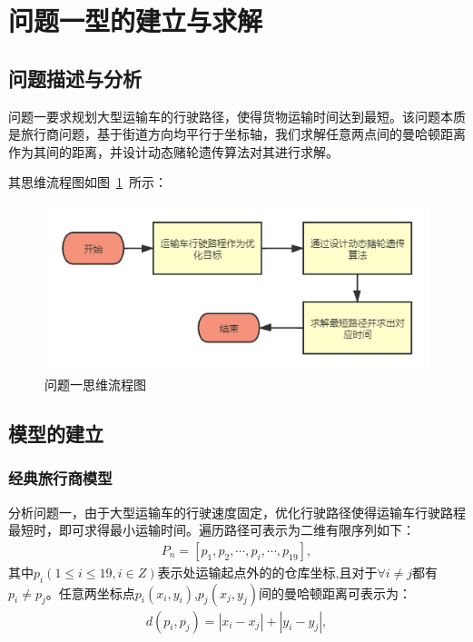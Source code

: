 \documentclass{whutmod}
\begin{document}
	\section{问题一型的建立与求解}
    \subsection{问题描述与分析}
问题一要求规划大型运输车的行驶路径，使得货物运输时间达到最短。该问题本质是旅行商问题，基于街道方向均平行于坐标轴，我们求解任意两点间的曼哈顿距离作为其间的距离，并设计动态赌轮遗传算法对其进行求解。


    其思维流程图如图~\ref{lct}~所示：

       \begin{figure}[H]
	   	\centering
	   	\includegraphics[width=\textwidth]{figures/abab.png}
	   	\caption{问题一思维流程图}\label{lct}
	   \end{figure}

   
	    \subsection{模型的建立}
	    \subsubsection{经典旅行商模型}
	    分析问题一，由于大型运输车的行驶速度固定，优化行驶路径使得运输车行驶路程最短时，即可求得最小运输时间。遍历路径可表示为二维有限序列如下：
	     \begin{gather}
	    P_n=[p_{1},p_{2},\cdots,p_{i},\cdots,p_{19}] ,
	    \end{gather}
	    其中$p_{i}(1\leqslant i \leqslant 19 ,i\in Z)$表示处运输起点外的的仓库坐标,且对于$\forall i \neq j$都有$p_i \neq p_j $。任意两坐标点$p_i(x_i,y_i)$,$p_j(x_j,y_j)$间的曼哈顿距离可表示为：
	     \begin{gather*}
	     d(p_i,p_j)=\left | x_i-x_j \right |+\left | y_i-y_j \right | ,
	     \end{gather*}
	     
\end{document}
